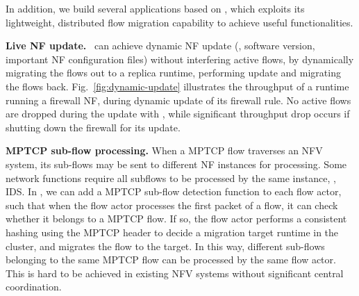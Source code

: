 In addition, we build several applications based on \nfactor, which exploits its lightweight, distributed flow migration capability to achieve useful functionalities. %

\vspace{1mm}
\noindent\textbf{Live NF update.} %
 \nfactor~can achieve dynamic NF update (\eg, software version, important NF configuration files) without interfering active flows, by dynamically migrating the flows out to a replica runtime, performing update and migrating the flows back. Fig.~\ref{fig:dynamic-update} illustrates the throughput of a runtime running a firewall NF, during dynamic update of its firewall rule. No active flows are dropped during the update with \nfactor, while significant throughput drop occurs if shutting down the firewall for its update.

\vspace{1mm}
\noindent\textbf{MPTCP sub-flow processing.} When a MPTCP \cite{wischik2011design} %
flow traverses an NFV system, its sub-flows may be sent to different NF instances for processing. Some network functions require all subflows to be processed by the same instance, \eg, IDS. %
In \nfactor, we can add a MPTCP sub-flow detection function to each flow actor, such that when the flow actor processes the first packet of a flow, it can check whether it belongs to a MPTCP flow. If so, the flow actor performs a consistent hashing using the MPTCP header to decide a migration target runtime in the cluster, and migrates the flow to the target. In this way, different sub-flows belonging to the same MPTCP flow can be processed by the same flow actor. This is hard to be achieved in existing NFV systems without significant central coordination. %


